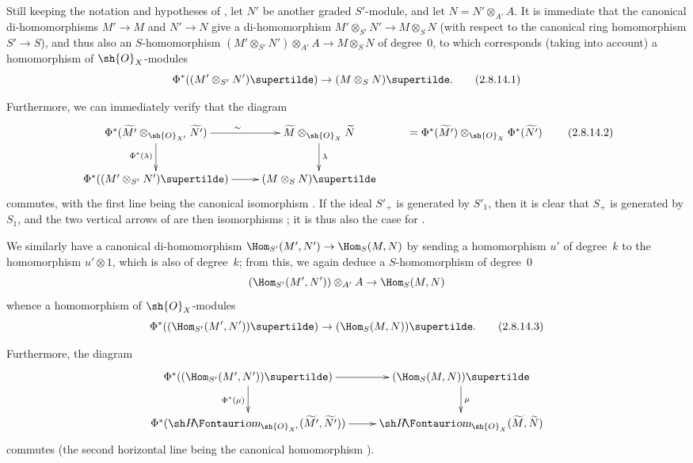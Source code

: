 \begin{env}[2.8.14]
\label{II.2.8.14}
Still keeping the notation and hypotheses of , let $N'$ be another graded $S'$-module, and let $N=N'\otimes_{A'}A$.
It is immediate that the canonical di-homomorphisms $M'\to M$ and $N'\to N$ give a di-homomorphism $M'\otimes_{S'}N'\to M\otimes_S N$ (with respect to the canonical ring homomorphism $S'\to S$), and thus also an $S$-homomorphism $(M'\otimes_{S'}N')\otimes_{A'}A\to M\otimes_S N$ of degree~$0$, to which corresponds (taking  into account) a homomorphism of $\sh{O}_X$-modules
\[
\label{II.2.8.14.1}
  \Phi^*((M'\otimes_{S'}N')\supertilde) \to (M\otimes_S N)\supertilde.
\tag{2.8.14.1}
\]

Furthermore, we can immediately verify that the diagram
\[
\label{II.2.8.14.2}
  \xymatrix{
    \Phi^*(\widetilde{M'}\otimes_{\sh{O}_{X'}}\widetilde{N'}) \ar[r]^\sim \ar[d]_{\Phi^*(\lambda)}
    & \widetilde{M}\otimes_{\sh{O}_X}\widetilde{N} \ar[d]^\lambda
    & =\Phi^*(\widetilde{M'})\otimes_{\sh{O}_X}\Phi^*(\widetilde{N'})
  \\\Phi^*((M'\otimes_{S'}N')\supertilde) \ar[r]
    & (M\otimes_S N)\supertilde
  }
\tag{2.8.14.2}
\]
commutes, with the first line being the canonical isomorphism .
If the ideal $S'_+$ is generated by $S'_1$, then it is clear that $S_+$ is generated by $S_1$, and the two vertical arrows of  are then isomorphisms ;
it is thus also the case for .

We similarly have a canonical di-homomorphism $\Hom_{S'}(M',N')\to\Hom_S(M,N)$ by sending a homomorphism $u'$ of degree~$k$ to the homomorphism $u'\otimes1$, which is also of degree~$k$;
from this, we again deduce a $S$-homomorphism of degree~$0$
\[
  (\Hom_{S'}(M',N'))\otimes_{A'}A \to \Hom_S(M,N)
\]
whence a homomorphism of $\sh{O}_X$-modules
\[
\label{II.2.8.14.3}
  \Phi^*((\Hom_{S'}(M',N'))\supertilde) \to (\Hom_S(M,N))\supertilde.
\tag{2.8.14.3}
\]

Furthermore, the diagram
\[
  \xymatrix{
    \Phi^*((\Hom_{S'}(M',N'))\supertilde) \ar[r] \ar[d]_{\Phi^*(\mu)}
    & (\Hom_S(M,N))\supertilde \ar[d]^\mu
  \\\Phi^*(\shHom_{\sh{O}_{X'}}(\widetilde{M'},\widetilde{N'})) \ar[r]
    & \shHom_{\sh{O}_X}(\widetilde{M},\widetilde{N})
  }
\]
commutes (the second horizontal line being the canonical homomorphism ).
\end{env}


